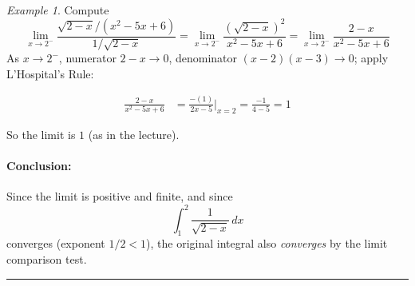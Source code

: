 \documentclass[12pt]{article}
\theoremstyle{definition}
\theoremstyle{plain}
\theoremstyle{remark}
\newtheorem{example}[definition]{Example}
\begin{document}
\begin{example}
Compute
\[
\lim_{x\to2^-} \frac{\sqrt{2-x}/(x^2-5x+6)}{1/\sqrt{2-x}} = \lim_{x\to2^-} \frac{(\sqrt{2-x})^2}{x^2-5x+6} = \lim_{x\to2^-} \frac{2-x}{x^2-5x+6}
\]
As $x\to2^-$, numerator $2-x\to 0$, denominator $(x-2)(x-3)\to 0$; apply L'Hospital's Rule:

\begin{align*}
\frac{2-x}{x^2-5x+6} &= \frac{-(1)}{2x-5} \bigg|_{x=2} = \frac{-1}{4-5} = 1
\end{align*}

So the limit is $1$ (as in the lecture).

\paragraph{Conclusion:} Since the limit is positive and finite, and since
\[
\int_1^2 \frac{1}{\sqrt{2-x}}\,dx
\]
converges (exponent $1/2 < 1$), the original integral also \emph{converges} by the limit comparison test.
\end{example}

\hrule
\end{document}
